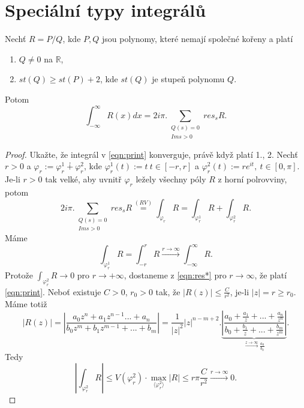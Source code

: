\section{Speciální typy integrálů}
\begin{theorem}
Nechť $R=P/Q$, kde $P,Q$ jsou polynomy, které nemají společné kořeny a platí 
\begin{enumerate}
    \item $Q\neq0$ na $\mathbb{R}$,
    \item $st(Q)\geq st(P)+2$, kde $st(Q)$ je stupeň polynomu $Q$.
\end{enumerate}
Potom
\begin{equation}
    \int_{-\infty}^\infty{R(x)dx}=2i\pi.\sum_{\begin{array}{cc}
         Q(s)=0  \\
         {Im}{s}>0 
    \end{array}}{res_s{R}}.
    \label{eqn:print}
\end{equation}
\end{theorem}
\begin{proof}
Ukažte, že integrál v \cref{eqn:print} konverguje, právě když platí 1., 2. Nechť $r>0$ a $\varphi_r:=\varphi^1_r\dotplus\varphi^2_r$, kde $\varphi^1_r(t):=t\ t\in[-r,r]$ a $\varphi^2_r(t):=re^{it},\ t\in[0,\pi]$. Je-li $r>0$ tak velké, aby uvnitř $\varphi_r$ ležely všechny póly $R$ z horní polrovviny, potom
\begin{equation}
    2i\pi.\sum_{\begin{array}{cc}
         Q(s)=0  \\
         {Im}{s}>0 
    \end{array}}{res_s{R}}
    \overset{(RV)}{=}
    \int_{\varphi_r}{R}=
    \int_{\varphi_r^1}{R} +\int_{\varphi_r^2}{R}.
    \label{eqn:res*}
\end{equation}
Máme 
$$\int_{\varphi_r^1}{R}=
\int_{-r}^r{R}\overset{r\to\infty}{\longrightarrow}
\int_{-\infty}^\infty{R}.$$
Protože $\int_{\varphi_r^2}{R}\to{0}$ pro $r\to{+\infty}$, dostaneme z \cref{eqn:res*} pro $r\to\infty$, že platí \cref{eqn:print}.  Neboť existuje $C>0$, $r_0>0$ tak, že $|R(z)|\leq\frac{C}{r^2}$, je-li $|z|=r\geq{r_0}$. Máme totiž
$$|R(z)|=\left|\frac{a_0 z^n+a_1 z^{n-1}...+a_n}{b_0 z^m+b_1 z^{m-1}+...+b_m}\right|=\frac{1}{|z|^2}|z|^{n-m+2}.\underset{\overset{z\to\infty}{\longrightarrow}\frac{a_0}{b_0}}{\underbrace{\left|\frac{a_0+\frac{a_1}{z}+...+\frac{a_n}{z^n}}{b_0+\frac{b_1}{z}+...+\frac{b_m}{z^m}}\right|}}.$$
Tedy
$$\left|\int_{\varphi^2_r}{R}\right|\leq V(\varphi^2_r)\cdot\max_{\langle{\varphi^2_r}\rangle}{|R|}
\leq r\pi\frac{C}{r^2}\overset{r\to\infty}{\longrightarrow}0.$$
\end{proof}

